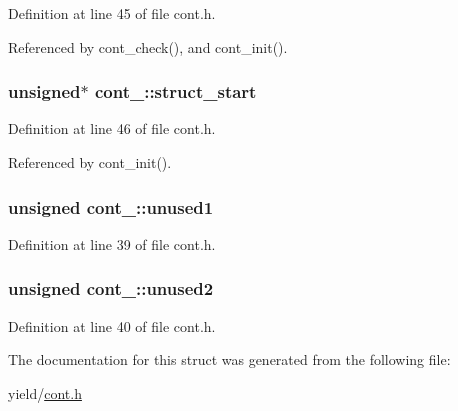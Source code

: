 Definition at line 45 of file cont.\-h.



Referenced by cont\-\_\-check(), and cont\-\_\-init().

\hypertarget{structcont___aa75475b47ca0d3a4a691651402c94fa3}{
\subsubsection[{struct\-\_\-start}]{\setlength{\rightskip}{0pt plus 5cm}unsigned$\ast$ cont\-\_\-\-::struct\-\_\-start}}\label{structcont___aa75475b47ca0d3a4a691651402c94fa3}


Definition at line 46 of file cont.\-h.



Referenced by cont\-\_\-init().

\hypertarget{structcont___ab61b08c26f5251cdb06e9b2173da911f}{
\subsubsection[{unused1}]{\setlength{\rightskip}{0pt plus 5cm}unsigned cont\-\_\-\-::unused1}}\label{structcont___ab61b08c26f5251cdb06e9b2173da911f}


Definition at line 39 of file cont.\-h.

\hypertarget{structcont___a4571d78e98dbcf7547ea1dc49c7b7a58}{
\subsubsection[{unused2}]{\setlength{\rightskip}{0pt plus 5cm}unsigned cont\-\_\-\-::unused2}}\label{structcont___a4571d78e98dbcf7547ea1dc49c7b7a58}


Definition at line 40 of file cont.\-h.



The documentation for this struct was generated from the following file\-:\begin{DoxyCompactItemize}
\item 
yield/\hyperlink{cont_8h}{cont.\-h}\end{DoxyCompactItemize}

